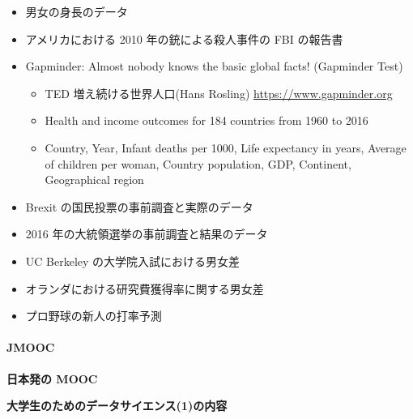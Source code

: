\documentclass[
]{book}
\providecommand{\tightlist}{%
  \setlength{\itemsep}{0pt}\setlength{\parskip}{0pt}}
\theoremstyle{definition}
\theoremstyle{definition}
\theoremstyle{definition}
\theoremstyle{definition}
\theoremstyle{remark}
\begin{document}
\begin{itemize}
\tightlist
\item
  男女の身長のデータ
\item
  アメリカにおける 2010 年の銃による殺人事件の FBI の報告書
\item
  Gapminder: Almost nobody knows the basic global facts! (Gapminder Test)

  \begin{itemize}
  \tightlist
  \item
    TED 増え続ける世界人口(Hans Rosling) \url{https://www.gapminder.org}
  \item
    Health and income outcomes for 184 countries from 1960 to 2016
  \item
    Country, Year, Infant deaths per 1000, Life expectancy in years, Average of children per woman,
    Country population, GDP, Continent, Geographical region
  \end{itemize}
\item
  Brexit の国民投票の事前調査と実際のデータ
\item
  2016 年の大統領選挙の事前調査と結果のデータ
\item
  UC Berkeley の大学院入試における男女差
\item
  オランダにおける研究費獲得率に関する男女差
\item
  プロ野球の新人の打率予測
\end{itemize}

\hypertarget{jmooc}{%
\paragraph{JMOOC}\label{jmooc}}

\textbf{日本発の MOOC}

\textbf{大学生のためのデータサイエンス(1)の内容}
\end{document}
